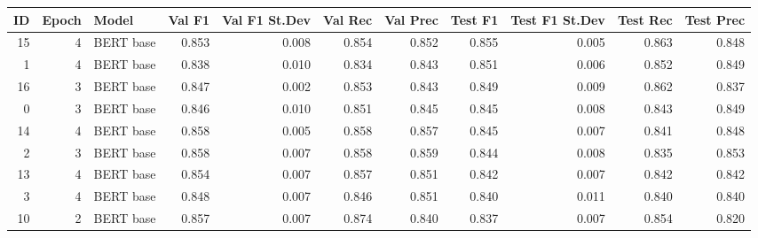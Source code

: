 \begin{tabular}{rrlrrrrrrrr}
\toprule
 ID &  Epoch &     Model &  Val F1 &  Val F1 St.Dev &  Val Rec &  Val Prec &  Test F1 &  Test F1 St.Dev &  Test Rec &  Test Prec \\
\midrule
 15 &      4 & BERT base &   0.853 &          0.008 &    0.854 &     0.852 &    0.855 &           0.005 &     0.863 &      0.848 \\
  1 &      4 & BERT base &   0.838 &          0.010 &    0.834 &     0.843 &    0.851 &           0.006 &     0.852 &      0.849 \\
 16 &      3 & BERT base &   0.847 &          0.002 &    0.853 &     0.843 &    0.849 &           0.009 &     0.862 &      0.837 \\
  0 &      3 & BERT base &   0.846 &          0.010 &    0.851 &     0.845 &    0.845 &           0.008 &     0.843 &      0.849 \\
 14 &      4 & BERT base &   0.858 &          0.005 &    0.858 &     0.857 &    0.845 &           0.007 &     0.841 &      0.848 \\
  2 &      3 & BERT base &   0.858 &          0.007 &    0.858 &     0.859 &    0.844 &           0.008 &     0.835 &      0.853 \\
 13 &      4 & BERT base &   0.854 &          0.007 &    0.857 &     0.851 &    0.842 &           0.007 &     0.842 &      0.842 \\
  3 &      4 & BERT base &   0.848 &          0.007 &    0.846 &     0.851 &    0.840 &           0.011 &     0.840 &      0.840 \\
 10 &      2 & BERT base &   0.857 &          0.007 &    0.874 &     0.840 &    0.837 &           0.007 &     0.854 &      0.820 \\
\bottomrule
\end{tabular}
